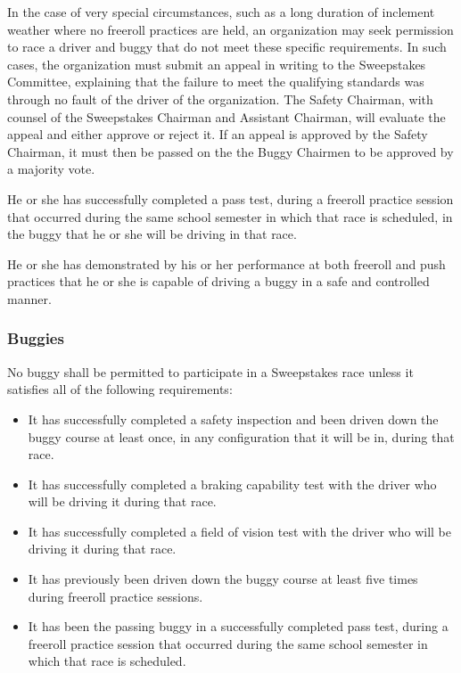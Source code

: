 In the case of very special circumstances, such as a long duration of inclement weather where no freeroll practices are held, an organization may seek permission to race a driver and buggy that do not meet these specific requirements. In such cases, the organization must submit an appeal in writing to the Sweepstakes Committee, explaining that the failure to meet the qualifying standards was through no fault of the driver of the organization. The Safety Chairman, with counsel of the Sweepstakes Chairman and Assistant Chairman, will evaluate the appeal and either approve or reject it. If an appeal is approved by the Safety Chairman, it must then be passed on the the Buggy Chairmen to be approved by a majority vote.

He or she has successfully completed a pass test, during a freeroll practice session that occurred during the same school semester in which that race is scheduled, in the buggy that he or she will be driving in that race.

He or she has demonstrated by his or her performance at both freeroll and push practices that he or she is capable of driving a buggy in a safe and controlled manner.

\subsubsection{Buggies}

	No buggy shall be permitted to participate in a Sweepstakes race unless it satisfies all of the following requirements:
	\begin{itemize}
		\item It has successfully completed a safety inspection and been driven down the buggy course at least once, in any configuration that it will be in, during that race.

		\item It has successfully completed a braking capability test with the driver who will be driving it during that race.

		\item It has successfully completed a field of vision test with the driver who will be driving it during that race.

		\item It has previously been driven down the buggy course at least five times during freeroll practice sessions.

		\item It has been the passing buggy in a successfully completed pass test, during a freeroll practice session that occurred during the same school semester in which that race is scheduled.
	\end{itemize}

